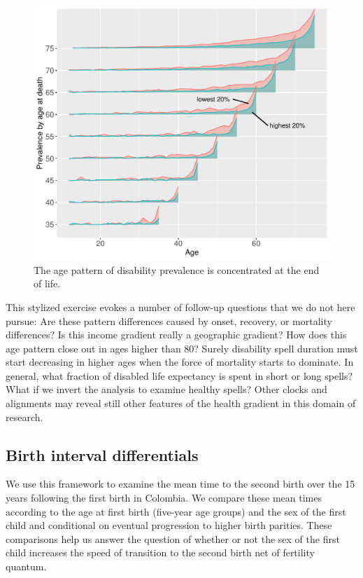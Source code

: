 \documentclass{article}
\begin{document}
\begin{figure}
    \centering
    \includegraphics[scale=.6]{Figures/App1_macro3.pdf}
    \caption{The age pattern of disability prevalence is concentrated at the end of life. }
    \label{fig:a1m3}
\end{figure}

This stylized exercise evokes a number of follow-up questions that we do not here pursue: Are these pattern differences caused by onset, recovery, or mortality differences? Is this income gradient really a geographic gradient? How does this age pattern close out in ages higher than 80? Surely disability spell duration must start decreasing in higher ages when the force of mortality starts to dominate. In general, what fraction of disabled life expectancy is spent in short or long spells? What if we invert the analysis to examine healthy spells? Other clocks and alignments may reveal still other features of the health gradient in this domain of research.

\FloatBarrier
\subsection{Birth interval differentials}

 We use this framework to examine the mean time to the second birth over the 15 years following the first birth in Colombia. We compare these mean times according to the age at first birth (five-year age groups) and the sex of the first child and conditional on eventual progression to higher birth parities. These comparisons help us answer the question of whether or not the sex of the first child increases the speed of transition to the second birth net of fertility quantum. 
 
\end{document}
